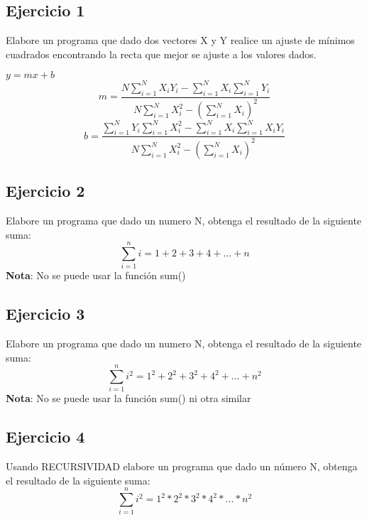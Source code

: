 \documentclass{article}
\begin{document}
\subsection{Ejercicio 1}
	Elabore un programa que dado dos vectores X y Y realice un ajuste de mínimos cuadrados encontrando la recta que mejor se ajuste a los valores dados.
	
	$ y=mx+b $
	\[
	m=\frac{N\sum_{i=1}^NX_iY_i-\sum_{i=1}^NX_i\sum_{i=1}^NY_i}{N\sum_{i=1}^NX_i^2-(\sum_{i=1}^NX_i)^2}
	\]
	\[
	b=\frac{\sum_{i=1}^NY_i\sum_{i=1}^NX_i^2-\sum_{i=1}^NX_i\sum_{i=1}^NX_iY_i}{N\sum_{i=1}^NX_i^2-(\sum_{i=1}^NX_i)^2}
	\]
\subsection{Ejercicio 2}
Elabore un programa que dado un numero N, obtenga el resultado de la siguiente suma:
\[
	\sum_{i=1}^{n}i=1+2+3+4+...+n
\]
\textbf{Nota}: No se puede usar la función sum()
\subsection{Ejercicio 3}
Elabore un programa que dado un numero N, obtenga el resultado de la siguiente suma:
\[
\sum_{i=1}^{n}i^2=1^2+2^2+3^2+4^2+...+n^2
\]
\textbf{Nota}: No se puede usar la función sum() ni otra similar
\subsection{Ejercicio 4}
Usando RECURSIVIDAD elabore un programa que dado un número N, obtenga el resultado de la siguiente suma:
\[
\sum_{i=1}^{n}i^2=1^2*2^2*3^2*4^2*...*n^2
\]
\end{document}
